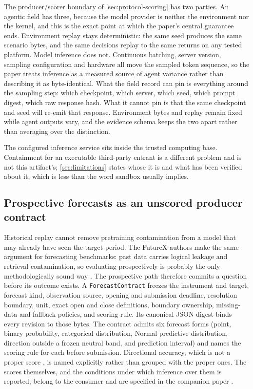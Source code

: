 The producer/scorer boundary of \cref{sec:protocol-scoring} has two parties. An agentic field has three, because the model provider is neither the environment nor the kernel, and this is the exact point at which the paper's central guarantee ends. Environment replay stays deterministic: the same seed produces the same scenario bytes, and the same decisions replay to the same returns on any tested platform. Model inference does not. Continuous batching, server version, sampling configuration and hardware all move the sampled token sequence, so the paper treats inference as a measured source of agent variance rather than describing it as byte-identical. What the field record can pin is everything around the sampling step: which checkpoint, which server, which seed, which prompt digest, which raw response hash. What it cannot pin is that the same checkpoint and seed will re-emit that response. Environment bytes and replay remain fixed while agent outputs vary, and the evidence schema keeps the two apart rather than averaging over the distinction.

The configured inference service sits inside the trusted computing base. Containment for an executable third-party entrant is a different problem and is not this artifact's; \cref{sec:limitations} states whose it is and what has been verified about it, which is less than the word sandbox usually implies.

\subsection{Prospective forecasts as an unscored producer contract}\label{sec:prospective-protocol}

Historical replay cannot remove pretraining contamination from a model that may already have seen the target period. The FutureX authors make the same argument for forecasting benchmarks: past data carries logical leakage and retrieval contamination, so evaluating prospectively is probably the only methodologically sound way \citep[p.~2]{zeng2025futurex}. The prospective path therefore commits a question before its outcome exists. A \texttt{ForecastContract} freezes the instrument and target, forecast kind, observation source, opening and submission deadline, resolution boundary, unit, exact open and close definitions, boundary ownership, missing-data and fallback policies, and scoring rule. Its canonical JSON digest binds every revision to those bytes. The contract admits six forecast forms (point, binary probability, categorical distribution, Normal predictive distribution, direction outside a frozen neutral band, and prediction interval) and names the scoring rule for each before submission. Directional accuracy, which is not a proper score \citep{gneiting2007proper}, is named explicitly rather than grouped with the proper ones. The scores themselves, and the conditions under which inference over them is reported, belong to the consumer and are specified in the companion paper \citep{toca2026sharpebench}.

